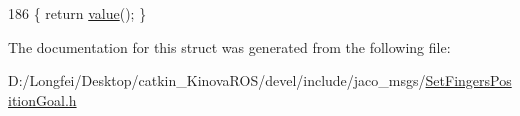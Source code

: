 \begin{DoxyCode}
186 \{ \textcolor{keywordflow}{return} \hyperlink{structros_1_1message__traits_1_1Definition_3_01_1_1jaco__msgs_1_1SetFingersPositionGoal___3_01ContainerAllocator_01_4_01_4_a2edc2eba7a5def57a5b8561f733cf298}{value}(); \}
\end{DoxyCode}


The documentation for this struct was generated from the following file\+:\begin{DoxyCompactItemize}
\item 
D\+:/\+Longfei/\+Desktop/catkin\+\_\+\+Kinova\+R\+O\+S/devel/include/jaco\+\_\+msgs/\hyperlink{SetFingersPositionGoal_8h}{Set\+Fingers\+Position\+Goal.\+h}\end{DoxyCompactItemize}
